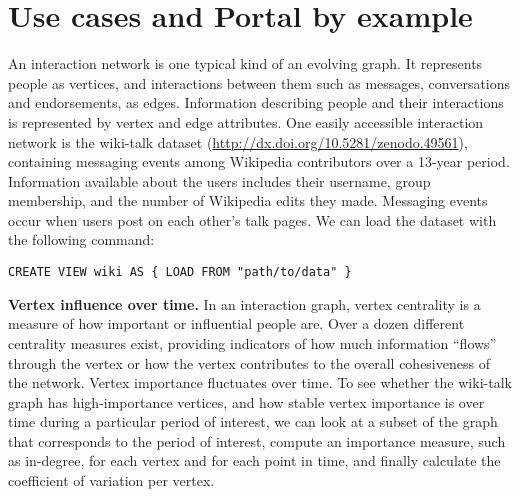 \section{Use cases and Portal by example}
\label{sec:cases}

An interaction network is one typical kind of an evolving graph.  It
represents people as vertices, and interactions between them such as
messages, conversations and endorsements, as edges.  Information
describing people and their interactions is represented by vertex and
edge attributes.  One easily accessible interaction network is the
wiki-talk dataset (\url{http://dx.doi.org/10.5281/zenodo.49561}),
containing messaging events among Wikipedia contributors over a
13-year period.  Information available about the users includes their
username, group membership, and the number of Wikipedia edits they
made.  Messaging events occur when users post on each other's talk
pages.  We can load the dataset with the following command:

\vspace{-0.1cm}
\begin{small} 
\begin{verbatim}
CREATE VIEW wiki AS { LOAD FROM "path/to/data" }
\end{verbatim}
\end{small}

{\bf Vertex influence over time.} In an interaction graph, vertex
centrality is a measure of how important or influential people are.
Over a dozen different centrality measures exist, providing indicators
of how much information ``flows'' through the vertex or how the vertex
contributes to the overall cohesiveness of the network.  Vertex
importance fluctuates over time.  To see whether the wiki-talk graph
has high-importance vertices, and how stable vertex importance is over
time during a particular period of interest, we can look at a subset
of the graph that corresponds to the period of interest, compute an
importance measure, such as in-degree, for each vertex and for each
point in time, and finally calculate the coefficient of variation per
vertex.


